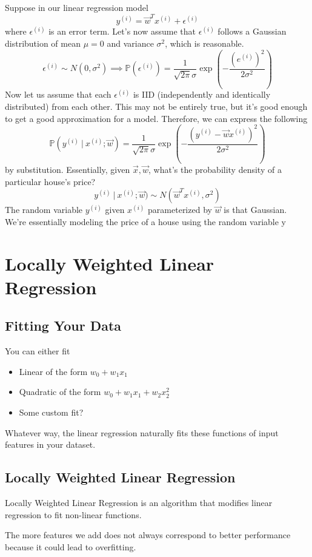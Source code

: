 \documentclass[12pt]{scrartcl}
\begin{document}
Suppose in our linear regression model
\[y^{(i)} = \vec{w}^Tx^{(i)} + \epsilon^{(i)}\]
where $\epsilon^{(i)}$ is an error term. Let's now assume that $\epsilon^{(i)}$ follows a Gaussian distribution of mean $\mu = 0$ and variance $\sigma^2$, which is reasonable.
\[\epsilon^{(i)} \sim N(0,\sigma^2) \implies \mathbb{P}(\epsilon^{(i)}) = \frac{1}{\sqrt{2\pi}\sigma}\exp(-\frac{(e^{(i)})^2}{2\sigma^2})\]
Now let us assume that each $\epsilon^{(i)}$ is IID (independently and identically distributed) from each other. This may not be entirely true, but it's good enough to get a good approximation for a model. Therefore, we can express the following
\[\mathbb{P}(y^{(i)} \ | \ x^{(i)}; \vec{w}) = \frac{1}{\sqrt{2\pi}\sigma }\exp(-\frac{(y^{(i)} - \vec{w}x^{(i)})^2}{2\sigma^2})\]
by substitution.
Essentially, given $\vec{x}, \vec{w}$, what's the probability density of a particular house's price?
\[y^{(i)} \ | \ x^{(i)}; \vec{w}) \sim N(\vec{w}^Tx^{(i)}, \sigma^2)\]
The random variable $y^{(i)}$ given $x^{(i)}$ parameterized by $\vec{w}$ is that Gaussian. We’re essentially modeling the price of a house using the random variable y


\section{Locally Weighted Linear Regression}

\subsection{Fitting Your Data}

You can either fit 
\begin{itemize}
    \item Linear of the form $w_0 + w_1x_1$
    \item Quadratic of the form $w_0 + w_1x_1 + w_2x_2^2$
    \item Some custom fit?
\end{itemize}
Whatever way, the linear regression naturally fits these functions of input features in your dataset.

\subsection{Locally Weighted Linear Regression}

Locally Weighted Linear Regression is an algorithm that modifies linear regression to fit non-linear functions.

\begin{note}
    The more features we add does not always correspond to better performance because it could lead to overfitting.
\end{note}
\end{document}
